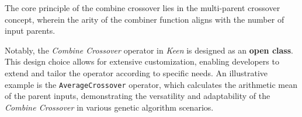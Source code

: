     \begin{remark}
        The core principle of the combine crossover lies in the multi-parent crossover concept, wherein the arity of the 
        combiner function aligns with the number of input parents.
    \end{remark}

    Notably, the \textit{Combine Crossover} operator in \textit{Keen} is designed as an \textbf{open class}. This design 
    choice allows for extensive customization, enabling developers to extend and tailor the operator according to 
    specific needs. An illustrative example is the \texttt{AverageCrossover} operator, which calculates the arithmetic 
    mean of the parent inputs, demonstrating the versatility and adaptability of the \textit{Combine Crossover} in 
    various genetic algorithm scenarios.
